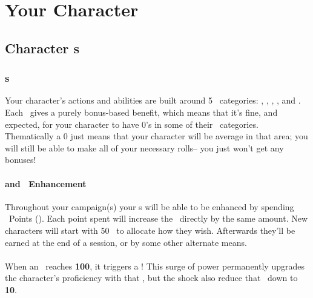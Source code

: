\part{Your Character}\label{part:char_creation}
\chapter{Character \attribute s}\label{ch:char_attributes}

\section{\attribute s}\label{sec:attributes}
Your character's actions and abilities are built around 5 \attribute\ 
categories: \POWEful, \KNOWful, \ENDUful, \SPEDful, and \FOREful. Each \attribute\  gives a purely
bonus-based benefit, which means that it's fine, and expected, for
your character to have 0's in some of their \attribute\  categories.
Thematically a 0 just means that your character will be average in that
area; you will still be able to make all of your necessary rolls--
you just won't get any bonuses! 

\subsection{\attrval and \attribute\ Enhancement}\label{subsec:attr_points}
Throughout your campaign(s) your \attribute s will be able to be enhanced by spending \attribute\ Points (\attrval). Each point spent will increase the \attribute\ directly by the same amount. New characters will start with 50 \attrval\ to allocate how they wish. Afterwards they'll be earned at the end of a session, or by some other alternate means.


\subsection{\BURST\index{\BURST}}\label{subsec:BURST}
When an \attribute\ reaches \textbf{100}, it triggers a \BURST !
This surge of power permanently upgrades the character's proficiency with that \attribute , but the shock also reduce that \attribute\ down to \textbf{10}.

